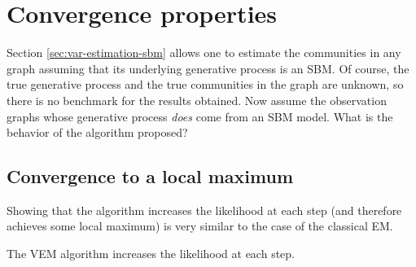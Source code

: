 \documentclass[../../main.tex]{subfiles} %
\begin{document}
\section{Convergence properties}
Section \ref{sec:var-estimation-sbm} allows one to estimate the communities in 
any graph assuming that its underlying generative process is an SBM. Of course, 
the true generative process and the true communities in the graph are unknown, 
so there is no benchmark for the results obtained. Now assume the observation 
graphs whose generative process \textit{does} come from an SBM model. What is 
the behavior of the algorithm proposed?

\subsection{Convergence to a local maximum}
Showing that the algorithm increases the likelihood at each step (and therefore 
achieves some local maximum) is very similar to the case of the classical EM.

\begin{proposition}
	The VEM algorithm increases the likelihood at each step.
\end{proposition}
\end{document}
